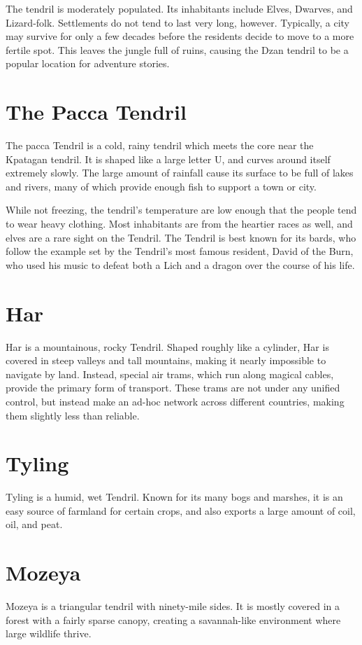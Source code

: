 \begin{multicols}{2}
The tendril is moderately populated.
Its inhabitants include Elves, Dwarves, and Lizard-folk.
Settlements do not tend to last very long, however.
Typically, a city may survive for only a few decades before the residents decide to move to a more fertile spot.
This leaves the jungle full of ruins, causing the Dzan tendril to be a popular location for adventure stories.
\section{The Pacca Tendril}
The pacca Tendril is a cold, rainy tendril which meets the core near the Kpatagan tendril.
It is shaped like a large letter U, and curves around itself extremely slowly.
The large amount of rainfall cause its surface to be full of lakes and rivers, many of which provide enough fish to support a town or city.

While not freezing, the tendril's temperature are low enough that the people tend to wear heavy clothing.
Most inhabitants are from the heartier races as well, and elves are a rare sight on the Tendril.
The Tendril is best known for its bards, who follow the example set by the Tendril's most famous resident, David of the Burn, who used his music to defeat both a Lich and a dragon over the course of his life.

\section{Har}
Har is a mountainous, rocky Tendril.
Shaped roughly like a cylinder, Har is covered in steep valleys and tall mountains, making it nearly impossible to navigate by land.
Instead, special air trams, which run along magical cables, provide the primary form of transport.
These trams are not under any unified control, but instead make an ad-hoc network across different countries, making them slightly less than reliable.

\section{Tyling}
Tyling is a humid, wet Tendril.
Known for its many bogs and marshes, it is an easy source of farmland for certain crops, and also exports a large amount of coil, oil, and peat.

\section{Mozeya}
Mozeya is a triangular tendril with ninety-mile sides.
It is mostly covered in a forest with a fairly sparse canopy, creating a savannah-like environment where large wildlife thrive.


\end{multicols}
